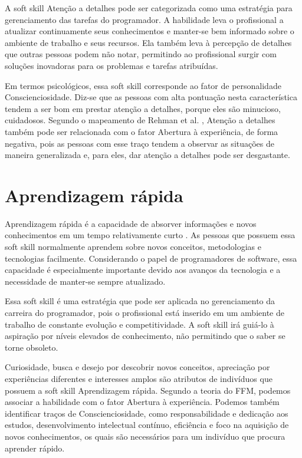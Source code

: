 A soft skill Atenção a detalhes pode ser categorizada como uma estratégia para gerenciamento das tarefas do programador. A habilidade leva o profissional a atualizar continuamente seus conhecimentos e manter-se bem informado sobre o ambiente de trabalho e seus recursos. Ela também leva à percepção de detalhes que outras pessoas podem não notar, permitindo ao profissional surgir com soluções inovadoras para os problemas e tarefas atribuídas.

Em termos psicológicos, essa soft skill corresponde ao fator de personalidade Conscienciosidade. Diz-se que as pessoas com alta pontuação nesta característica tendem a ser bom em prestar atenção a detalhes, porque eles são minucioso, cuidadosos. Segundo o mapeamento de Rehman et al. \cite{rehman:12}, Atenção a detalhes também pode ser relacionada com o fator Abertura à experiência, de forma negativa, pois as pessoas com esse traço tendem a observar as situações de maneira generalizada e, para eles, dar atenção a detalhes pode ser desgastante.

\section{Aprendizagem rápida}

Aprendizagem rápida é a capacidade de absorver informações e novos conhecimentos em um tempo relativamente curto \cite{ahmed:12}. As pessoas que possuem essa soft skill normalmente aprendem sobre novos conceitos, metodologias e tecnologias facilmente. Considerando o papel de programadores de software, essa capacidade é especialmente importante devido aos avanços da tecnologia e a necessidade de manter-se sempre atualizado.

Essa soft skill é uma estratégia que pode ser aplicada no gerenciamento da carreira do programador, pois o profissional está inserido em um ambiente de trabalho de constante evolução e competitividade. A soft skill irá guiá-lo à aspiração por níveis elevados de conhecimento, não permitindo que o saber se torne obsoleto. 

Curiosidade, busca e desejo por descobrir novos conceitos, apreciação por experiências diferentes e interesses amplos são atributos de indivíduos que possuem a soft skill Aprendizagem rápida. Segundo a teoria do FFM, podemos associar a habilidade com o fator Abertura à experiência.
Podemos também identificar traços de Conscienciosidade, como responsabilidade e dedicação aos estudos, desenvolvimento intelectual contínuo, eficiência e foco na aquisição de novos conhecimentos, os quais são necessários para um indivíduo que procura aprender rápido.

